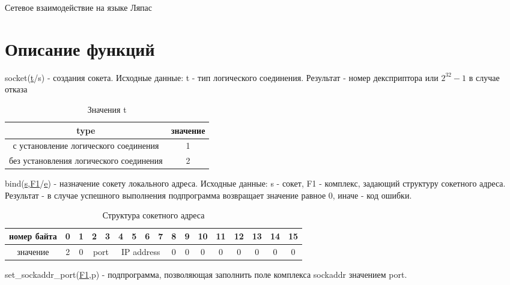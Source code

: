 \documentclass[12t,english,russian]{article}
\begin{document}
\huge
\begin{center}
{Сетевое взаимодействие на языке Ляпас}
\end{center}
\Large
\tableofcontents
\newpage

\large
\section[Описание функций]{Описание функций}
\label{socket}
\hspace{\parindent}
socket(\hyperref[type]{t}/s) - создания сокета. Исходные данные: t - тип логического соединения. Результат - номер дексприптора или $2^{32}-1$ в случае отказа

\begin{table}[ht]
\caption{\label{type}Значения t}
\begin{center}
\begin{tabular}{|c|c|}
\hline
type & значение \\
\hline
с установление логического соединения & 1 \\
без установления логического соединения & 2 \\
\hline
\end{tabular}
\end{center}
\end{table}

\label{bind}
bind(\hyperref[socket]{s},\hyperref[sockaddr]{F1}/\hyperref[error]{e}) - назначение сокету локального адреса. Исходные данные: s - сокет, F1 - комплекс, задающий структуру сокетного адреса. Результат - в случае успешного выполнения подпрограмма возвращает значение равное 0, иначе - код ошибки.

\begin{table}[H]
\caption{\label{sockaddr}Структура сокетного адреса}
\begin{center}
\begin{tabular}{|c|c|c|c|c|c|c|c|c|c|c|c|c|c|c|c|c|}
\hline
номер байта & 0 & 1 & 2 & 3 & 4 & 5 & 6 & 7 & 8 & 9 & 10 & 11 & 12 & 13 & 14 & 15 \\
\hline
значение & 2 & 0 & \multicolumn{2}{|c|}{port} & \multicolumn{4}{|c|}{IP address} & 0 & 0 & 0 & 0 & 0 & 0 & 0 & 0 \\
\hline
\end{tabular}
\end{center}
\end{table}

\label{set_sockaddr_port}
set\_sockaddr\_port(\hyperref[sockaddr]{F1},p) - подпрограмма, позволяющая заполнить поле комплекса sockaddr значением port.
\end{document}
